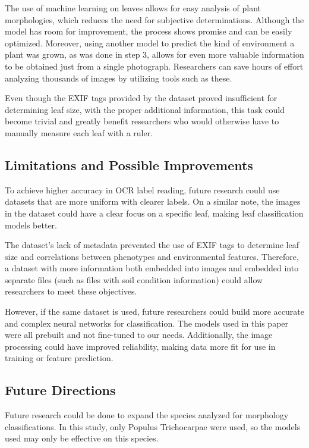 \documentclass[final,5p,times,twocolumn,authoryear]{elsarticle}
\begin{document}
The use of machine learning on leaves allows for easy analysis of plant morphologies, which reduces the need for subjective determinations. Although the model has room for improvement, the process shows promise and can be easily optimized. Moreover, using another model to predict the kind of environment a plant was grown, as was done in step 3, allows for even more valuable information to be obtained just from a single photograph. Researchers can save hours of effort analyzing thousands of images by utilizing tools such as these.

Even though the EXIF tags provided by the dataset proved insufficient for determining leaf size, with the proper additional information, this task could become trivial and greatly benefit researchers who would otherwise have to manually measure each leaf with a ruler.

\subsection{Limitations and Possible Improvements}

To achieve higher accuracy in OCR label reading, future research could use datasets that are more uniform with clearer labels. On a similar note, the images in the dataset could have a clear focus on a specific leaf, making leaf classification models better.

The dataset's lack of metadata prevented the use of EXIF tags to determine leaf size and correlations between phenotypes and environmental features. Therefore, a dataset with more information both embedded into images and embedded into separate files (such as files with soil condition information) could allow researchers to meet these objectives.

However, if the same dataset is used, future researchers could build more accurate and complex neural networks for classification. The models used in this paper were all prebuilt and not fine-tuned to our needs. Additionally, the image processing could have improved reliability, making data more fit for use in training or feature prediction.

\subsection{Future Directions}

Future research could be done to expand the species analyzed for morphology classifications. In this study, only Populus Trichocarpae were used, so the models used may only be effective on this species.
\end{document}
